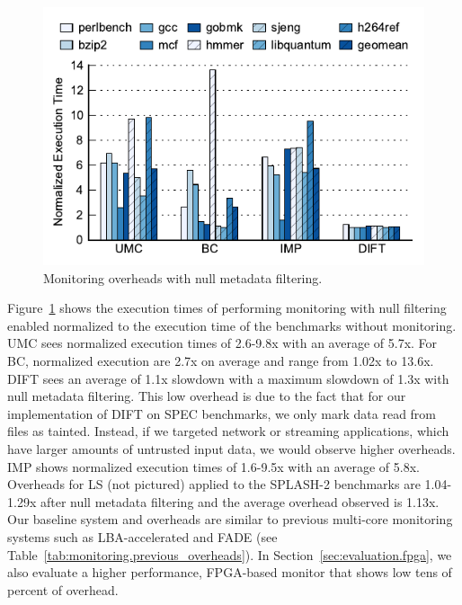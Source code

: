 \begin{figure}
  \begin{center}
    \includegraphics[width=\columnwidth]{figs/data_filtering.pdf}
    \vspace{-0.2in}
    \caption{Monitoring overheads with null metadata filtering.}
    \label{fig:evaluation.filtering}
    \vspace{-0.1in}
  \end{center}
\end{figure}

Figure~\ref{fig:evaluation.filtering} shows the
execution times of performing monitoring with null filtering enabled normalized
to the execution time of the benchmarks without monitoring. UMC sees normalized
execution times of 2.6-9.8x with an average of 5.7x.
For BC, normalized execution
are 2.7x on average and range from 1.02x to 13.6x.
DIFT sees an average of 1.1x slowdown with a maximum slowdown of 1.3x with null
metadata filtering. This low overhead is due to the fact
that for our implementation of DIFT on SPEC
benchmarks, we only mark data read from files as tainted. Instead, if we
targeted network or streaming applications, which have larger amounts of
untrusted input data, we would observe higher overheads. IMP shows normalized
execution times of 1.6-9.5x with an average of 5.8x. Overheads for LS (not pictured)
applied to the SPLASH-2 benchmarks are
1.04-1.29x after null metadata filtering and the average
overhead observed is 1.13x.
Our baseline system and overheads are similar to previous multi-core
monitoring systems such as LBA-accelerated \cite{lba-isca08} and FADE
\cite{fade-hpca14} (see
Table~\ref{tab:monitoring.previous_overheads}). In
Section~\ref{sec:evaluation.fpga}, we also evaluate a higher performance, FPGA-based
monitor that shows low tens of percent of overhead. 

